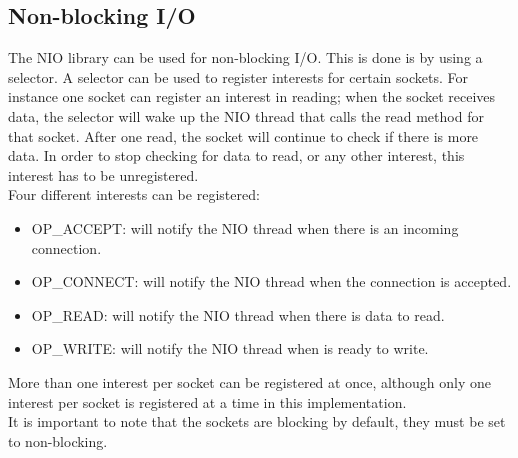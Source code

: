 \documentclass[11pt]{article}
\begin{document}
	\subsection{Non-blocking I/O}
	The NIO library can be used for non-blocking I/O. This is done is by using a selector. A selector can be used to register interests for certain sockets. For instance one socket can register an interest in reading; when the socket receives data, the selector will wake up the NIO thread that calls the read method for that socket. After one read, the socket will continue to check if there is more data. In order to stop checking for data to read, or any other interest, this interest has to be unregistered.\\
	Four different interests can be registered:
	 \begin{itemize}
		\item OP\_ACCEPT: will notify the NIO thread when there is an incoming connection.
		\item OP\_CONNECT: will notify the NIO thread when the connection is accepted.
		\item OP\_READ: will notify the NIO thread when there is data to read.
		\item OP\_WRITE: will notify the NIO thread when is ready to write.
	\end{itemize}
	More than one interest per socket can be registered at once, although only one interest per socket is registered at a time in this implementation.\\
	It is important to note that the sockets are blocking by default, they must be set to non-blocking.
\end{document}
